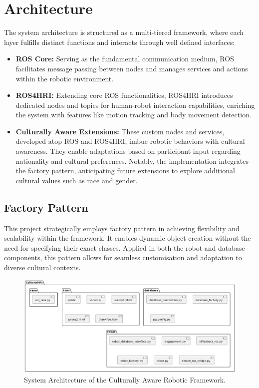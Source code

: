 \section{Architecture}

The system architecture is structured as a multi-tiered framework, where each layer fulfills distinct functions and interacts through well defined interfaces:

\begin{itemize}
    \item \textbf{ROS Core:} Serving as the fundamental communication medium, ROS facilitates message passing between nodes and manages services and actions within the robotic environment.
    \item \textbf{ROS4HRI:} Extending core ROS functionalities, ROS4HRI introduces dedicated nodes and topics for human-robot interaction capabilities, enriching the system with features like motion tracking and body movement detection.
    \item \textbf{Culturally Aware Extensions:} These custom nodes and services, developed atop ROS and ROS4HRI, imbue robotic behaviors with cultural awareness. They enable adaptations based on participant input regarding nationality and cultural preferences. Notably, the implementation integrates the factory pattern, anticipating future extensions to explore additional cultural values such as race and gender.
\end{itemize}

\subsection{Factory Pattern}

This project strategically employs factory pattern in achieving flexibility and scalability within the framework. It enables dynamic object creation without the need for specifying their exact classes. Applied in both the robot and database components, this pattern allows for seamless customisation and adaptation to diverse cultural contexts.

\begin{figure}
    \begin{center}
        \noindent\includegraphics[width=\linewidth]{Chapter5/package.png}  
        \caption{System Architecture of the Culturally Aware Robotic Framework.}
        \label{fig:figure1}
    \end{center}
\end{figure}

